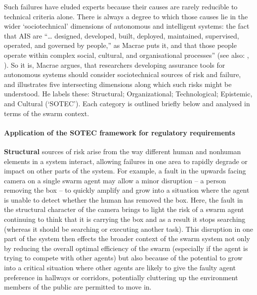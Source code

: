 \documentclass[lettersize,journal]{IEEEtran}
\begin{document}
Such failures have eluded experts because their causes are rarely reducible to technical criteria alone. There is always a degree to which those causes lie in the wider `sociotechnical’ dimensions of autonomous and intelligent systems: the fact that AIS are ``… designed, developed, built, deployed, maintained, supervised, operated, and governed by people,” as Macrae \cite{macrae2021learning} puts it, and that those people operate within complex social, cultural, and organisational processes” (see also: \cite{pettersen2021organizational}, \cite{reason2016managing}). So it is, Macrae \cite{macrae2021learning} argues, that researchers developing assurance tools for autonomous systems should consider sociotechnical sources of risk and failure, and illustrates five intersecting dimensions along which such risks might be understood. He labels these: Structural; Organizational; Technological; Epistemic, and Cultural (‘SOTEC’). Each category is outlined briefly below and  analysed in terms of the swarm context.

\paragraph*{Application of the SOTEC framework for regulatory requirements}
\textbf{Structural} sources of risk arise from the way different human and nonhuman elements in a system interact, allowing failures in one area to rapidly degrade or impact on other parts of the system. For example, a fault in the upwards facing camera on a single swarm agent may allow a minor disruption – a person removing the box – to quickly amplify and grow into a situation where the agent is unable to detect whether the human has removed the box. Here, the fault in the structural character of the camera brings to light the risk of a swarm agent continuing to think that it is carrying the box and as a result it stops searching (whereas it should be searching or executing another task). This disruption in one part of the system then effects the broader context of the swarm system not only by reducing the overall optimal efficiency of the swarm (especially if the agent is trying to compete with other agents) but also because of the potential to grow into a critical situation where other agents are likely to give the faulty agent preference in hallways or corridors, potentially cluttering up the environment members of the public are permitted to move in. 
\end{document}
